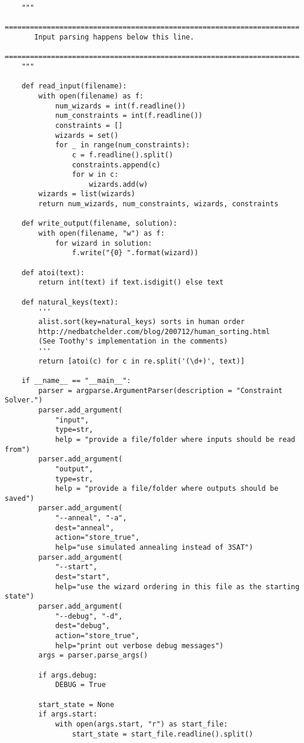 \documentclass{article}
\theoremstyle{plain}
\numberwithin{theorem}{subsection}
\theoremstyle{definition}
\numberwithin{equation}{subsection}
\begin{document}
\begin{lstlisting}
    """
    ======================================================================
       Input parsing happens below this line.
    ======================================================================
    """
    
    def read_input(filename):
        with open(filename) as f:
            num_wizards = int(f.readline())
            num_constraints = int(f.readline())
            constraints = []
            wizards = set()
            for _ in range(num_constraints):
                c = f.readline().split()
                constraints.append(c)
                for w in c:
                    wizards.add(w)
        wizards = list(wizards)
        return num_wizards, num_constraints, wizards, constraints
    
    def write_output(filename, solution):
        with open(filename, "w") as f:
            for wizard in solution:
                f.write("{0} ".format(wizard))
    
    def atoi(text):
        return int(text) if text.isdigit() else text
    
    def natural_keys(text):
        '''
        alist.sort(key=natural_keys) sorts in human order
        http://nedbatchelder.com/blog/200712/human_sorting.html
        (See Toothy's implementation in the comments)
        '''
        return [atoi(c) for c in re.split('(\d+)', text)]
    
    if __name__ == "__main__":
        parser = argparse.ArgumentParser(description = "Constraint Solver.")
        parser.add_argument(
            "input",
            type=str,
            help = "provide a file/folder where inputs should be read from")
        parser.add_argument(
            "output",
            type=str,
            help = "provide a file/folder where outputs should be saved")
        parser.add_argument(
            "--anneal", "-a",
            dest="anneal",
            action="store_true",
            help="use simulated annealing instead of 3SAT")
        parser.add_argument(
            "--start",
            dest="start",
            help="use the wizard ordering in this file as the starting state")
        parser.add_argument(
            "--debug", "-d",
            dest="debug",
            action="store_true",
            help="print out verbose debug messages")
        args = parser.parse_args()
    
        if args.debug:
            DEBUG = True
    
        start_state = None
        if args.start:
            with open(args.start, "r") as start_file:
                start_state = start_file.readline().split()
        

\end{lstlisting}
\end{document}
